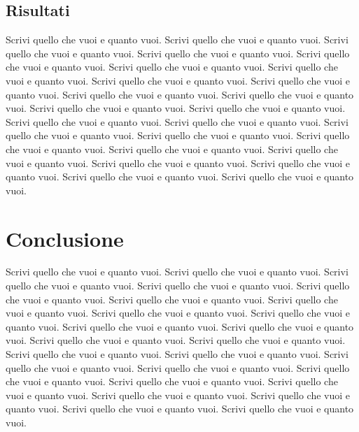 \documentclass[10pt,a4paper,twoside]{memoir} %
\begin{document}
\section{Risultati}
\label{subsection:Risultati}
Scrivi quello che vuoi e quanto vuoi. Scrivi quello che vuoi e quanto vuoi.
Scrivi quello che vuoi e quanto vuoi. Scrivi quello che vuoi e quanto vuoi.
Scrivi quello che vuoi e quanto vuoi. Scrivi quello che vuoi e quanto vuoi.
Scrivi quello che vuoi e quanto vuoi. Scrivi quello che vuoi e quanto vuoi.
Scrivi quello che vuoi e quanto vuoi. Scrivi quello che vuoi e quanto vuoi.
Scrivi quello che vuoi e quanto vuoi. Scrivi quello che vuoi e quanto vuoi.
Scrivi quello che vuoi e quanto vuoi. Scrivi quello che vuoi e quanto vuoi.
Scrivi quello che vuoi e quanto vuoi. Scrivi quello che vuoi e quanto vuoi.
Scrivi quello che vuoi e quanto vuoi. Scrivi quello che vuoi e quanto vuoi.
Scrivi quello che vuoi e quanto vuoi. Scrivi quello che vuoi e quanto vuoi.
Scrivi quello che vuoi e quanto vuoi. Scrivi quello che vuoi e quanto vuoi.
Scrivi quello che vuoi e quanto vuoi. Scrivi quello che vuoi e quanto vuoi.

\chapter{Conclusione}
\label{section:Conclusione}
Scrivi quello che vuoi e quanto vuoi. Scrivi quello che vuoi e quanto vuoi.
Scrivi quello che vuoi e quanto vuoi. Scrivi quello che vuoi e quanto vuoi.
Scrivi quello che vuoi e quanto vuoi. Scrivi quello che vuoi e quanto vuoi.
Scrivi quello che vuoi e quanto vuoi. Scrivi quello che vuoi e quanto vuoi.
Scrivi quello che vuoi e quanto vuoi. Scrivi quello che vuoi e quanto vuoi.
Scrivi quello che vuoi e quanto vuoi. Scrivi quello che vuoi e quanto vuoi.
Scrivi quello che vuoi e quanto vuoi. Scrivi quello che vuoi e quanto vuoi.
Scrivi quello che vuoi e quanto vuoi. Scrivi quello che vuoi e quanto vuoi.
Scrivi quello che vuoi e quanto vuoi. Scrivi quello che vuoi e quanto vuoi.
Scrivi quello che vuoi e quanto vuoi. Scrivi quello che vuoi e quanto vuoi.
Scrivi quello che vuoi e quanto vuoi. Scrivi quello che vuoi e quanto vuoi.
Scrivi quello che vuoi e quanto vuoi. Scrivi quello che vuoi e quanto vuoi.


\end{document}
